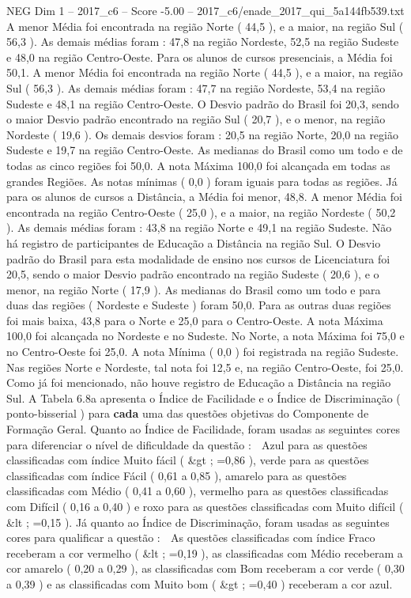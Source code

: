 \begin{textsample}{NEG Dim 1 – 2017\_c6 – Score -5.00 – 2017\_c6/enade\_2017\_qui\_5a144fb539.txt}
A menor Média foi encontrada na região Norte ( 44,5 ), e a maior, na região Sul ( 56,3 ).
As demais médias foram : 47,8 na região Nordeste, 52,5 na região Sudeste e 48,0 na região Centro-Oeste.
Para os alunos de cursos presenciais, a Média foi 50,1.
A menor Média foi encontrada na região Norte ( 44,5 ), e a maior, na região Sul ( 56,3 ).
As demais médias foram : 47,7 na região Nordeste, 53,4 na região Sudeste e 48,1 na região Centro-Oeste.
O Desvio padrão do Brasil foi 20,3, sendo o maior Desvio padrão encontrado na região Sul ( 20,7 ), e o menor, na região Nordeste ( 19,6 ).
Os demais desvios foram : 20,5 na região Norte, 20,0 na região Sudeste e 19,7 na região Centro-Oeste.
As medianas do Brasil como um todo e de todas as cinco regiões foi 50,0.
A nota Máxima 100,0 foi alcançada em todas as grandes Regiões.
As notas mínimas ( 0,0 ) foram iguais para todas as regiões.
Já para os alunos de cursos a Distância, a Média foi menor, 48,8.
A menor Média foi encontrada na região Centro-Oeste ( 25,0 ), e a maior, na região Nordeste ( 50,2 ).
As demais médias foram : 43,8 na região Norte e 49,1 na região Sudeste.
Não há registro de participantes de Educação a Distância na região Sul.
O Desvio padrão do Brasil para esta modalidade de ensino nos cursos de Licenciatura foi 20,5, sendo o maior Desvio padrão encontrado na região Sudeste ( 20,6 ), e o menor, na região Norte ( 17,9 ).
As medianas do Brasil como um todo e para duas das regiões ( Nordeste e Sudeste ) foram 50,0.
Para as outras duas regiões foi mais baixa, 43,8 para o Norte e 25,0 para o Centro-Oeste.
A nota Máxima 100,0 foi alcançada no Nordeste e no Sudeste.
No Norte, a nota Máxima foi 75,0 e no Centro-Oeste foi 25,0.
A nota Mínima ( 0,0 ) foi registrada na região Sudeste.
Nas regiões Norte e Nordeste, tal nota foi 12,5 e, na região Centro-Oeste, foi 25,0.
Como já foi mencionado, não houve registro de Educação a Distância na região Sul.
A Tabela 6.8a apresenta o Índice de Facilidade e o Índice de Discriminação ( ponto-bisserial ) para \textbf{cada} uma das questões objetivas do Componente de Formação Geral.
Quanto ao Índice de Facilidade, foram usadas as seguintes cores para diferenciar o nível de dificuldade da questão :  Azul para as questões classificadas com índice Muito fácil ( \&gt ; =0,86 ), verde para as questões classificadas com índice Fácil ( 0,61 a 0,85 ), amarelo para as questões classificadas com Médio ( 0,41 a 0,60 ), vermelho para as questões classificadas com Difícil ( 0,16 a 0,40 ) e roxo para as questões classificadas com Muito difícil ( \&lt ; =0,15 ).
Já quanto ao Índice de Discriminação, foram usadas as seguintes cores para qualificar a questão :  As questões classificadas com índice Fraco receberam a cor vermelho ( \&lt ; =0,19 ), as classificadas com Médio receberam a cor amarelo ( 0,20 a 0,29 ), as classificadas com Bom receberam a cor verde ( 0,30 a 0,39 ) e as classificadas com Muito bom ( \&gt ; =0,40 ) receberam a cor azul.

\end{textsample}
